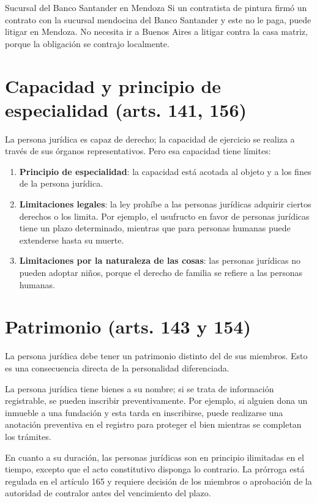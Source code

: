 \documentclass[12pt,oneside]{book}
\begin{document}
\begin{example}{Sucursal del Banco Santander en Mendoza}
Si un contratista de pintura firmó un contrato con la sucursal mendocina del Banco Santander y este no le paga, puede litigar en Mendoza. No necesita ir a Buenos Aires a litigar contra la casa matriz, porque la obligación se contrajo localmente.
\end{example}

\section{Capacidad y principio de especialidad (arts. 141, 156)}

La persona jurídica es capaz de derecho; la capacidad de ejercicio se realiza a través de sus órganos representativos. Pero esa capacidad tiene límites:

\begin{enumerate}
    \item \textbf{Principio de especialidad}: la capacidad está acotada al objeto y a los fines de la persona jurídica.
    \item \textbf{Limitaciones legales}: la ley prohíbe a las personas jurídicas adquirir ciertos derechos o los limita. Por ejemplo, el usufructo en favor de personas jurídicas tiene un plazo determinado, mientras que para personas humanas puede extenderse hasta su muerte.
    \item \textbf{Limitaciones por la naturaleza de las cosas}: las personas jurídicas no pueden adoptar niños, porque el derecho de familia se refiere a las personas humanas.
\end{enumerate}

\section{Patrimonio (arts. 143 y 154)}

La persona jurídica debe tener un patrimonio distinto del de sus miembros. Esto es una consecuencia directa de la personalidad diferenciada.

La persona jurídica tiene bienes a su nombre; si se trata de información registrable, se pueden inscribir preventivamente. Por ejemplo, si alguien dona un inmueble a una fundación y esta tarda en inscribirse, puede realizarse una anotación preventiva en el registro para proteger el bien mientras se completan los trámites.

\begin{note}
En cuanto a su duración, las personas jurídicas son en principio ilimitadas en el tiempo, excepto que el acto constitutivo disponga lo contrario. La prórroga está regulada en el artículo 165 y requiere decisión de los miembros o aprobación de la autoridad de contralor antes del vencimiento del plazo.
\end{note}
\end{document}
